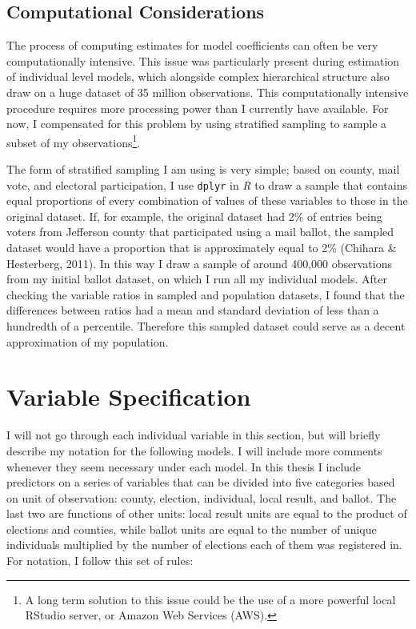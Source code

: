 \documentclass[12pt,twoside]{reedthesis}
\begin{document}
  \subsection{Computational
  Considerations}\label{computational-considerations}
  
  The process of computing estimates for model coefficients can often be
  very computationally intensive. This issue was particularly present
  during estimation of individual level models, which alongside complex
  hierarchical structure also draw on a huge dataset of 35 million
  observations. This computationally intensive procedure requires more
  processing power than I currently have available. For now, I compensated
  for this problem by using stratified sampling to sample a subset of my
  observations\footnote{A long term solution to this issue could be the
    use of a more powerful local RStudio server, or Amazon Web Services
    (AWS).}.
  
  The form of stratified sampling I am using is very simple; based on
  county, mail vote, and electoral participation, I use \texttt{dplyr} in
  \textit{R} to draw a sample that contains equal proportions of every
  combination of values of these variables to those in the original
  dataset. If, for example, the original dataset had 2\% of entries being
  voters from Jefferson county that participated using a mail ballot, the
  sampled dataset would have a proportion that is approximately equal to
  2\% (Chihara \& Hesterberg, 2011). In this way I draw a sample of around
  400,000 observations from my initial ballot dataset, on which I run all
  my individual models. After checking the variable ratios in sampled and
  population datasets, I found that the differences between ratios had a
  mean and standard deviation of less than a hundredth of a percentile.
  Therefore this sampled dataset could serve as a decent approximation of
  my population.
  
  \section{Variable Specification}\label{variable-specification}
  
  I will not go through each individual variable in this section, but will
  briefly describe my notation for the following models. I will include
  more comments whenever they seem necessary under each model. In this
  thesis I include predictors on a series of variables that can be divided
  into five categories based on unit of observation: county, election,
  individual, local result, and ballot. The last two are functions of
  other units: local result units are equal to the product of elections
  and counties, while ballot units are equal to the number of unique
  individuals multiplied by the number of elections each of them was
  registered in. For notation, I follow this set of rules:
  
\end{document}
